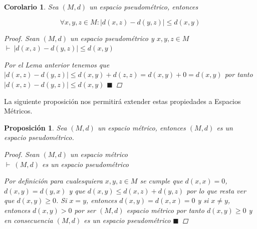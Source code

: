 \documentclass[oneside]{book} %
\theoremstyle{Teorema}
\newtheorem{Corolario}[Definicion]{Corolario}
\newtheorem{Proposicion}[Definicion]{Proposición}
\theoremstyle{Ejemplos}
\theoremstyle{[Obs]}
\newcommand{\abs}[1]{\left|#1\right|} %
\renewcommand{\{}{\left\lbrace} %
\renewcommand{\}}{\right\rbrace} %
\renewcommand{\qed}{$\blacksquare$} %
\newcommand{\pd}{$\vdash\ $} %
\begin{document}
			\begin{Corolario}\setlength{\parindent}{0em}

				Sea $(M, d)$ un espacio pseudométrico, entonces 

				\[ \forall x, y, z \in M : \abs{d(x, z) - d(y, z)} \leq d(x, y) \] 

				\begin{proof}
					
					Sean $(M, d)$ un espacio pseudométrico y $x, y, z \in M$ \\
					\pd $\abs{d(x, z) - d(y, z)} \leq d(x, y)$

					Por el Lema anterior tenemos que $\abs{d(x, z) - d(y, z)} \leq d(x, y) + d(z, z) = d(x, y) + 0 = d(x, y)$ por tanto $\abs{d(x, z) - d(y, z)} \leq d(x, y)$ \qed

				\end{proof}

			\end{Corolario}

			\noindent La siguiente proposición nos permitirá extender estas propiedades a Espacios Métricos.

			\begin{Proposicion}\setlength{\parindent}{0em}
				
				Sea $(M, d)$ un espacio métrico, entonces $(M, d)$ es un espacio pseudométrico.

				\begin{proof}
					
					Sean $(M, d)$ un espacio métrico \\
					\pd $(M, d)$ es un espacio pseudométrico

					Por definición para cualesquiera $x, y, z \in M$ se cumple que $d(x, x) = 0$, $d(x, y) = d(y, x)$ y que $d(x, y) \leq d(x, z) + d(y, z)$ por lo que resta ver que $d(x, y) \geq 0$. Si $x = y$, entonces $d(x, y) = d(x, x) = 0$ y si $x \neq y$, entonces $d(x, y) > 0$ por ser $(M, d)$ espacio métrico por tanto $d(x, y) \geq 0$ y en consecuencia $(M, d)$ es un espacio pseudométrico \qed 

				\end{proof}

			\end{Proposicion}
\end{document}
